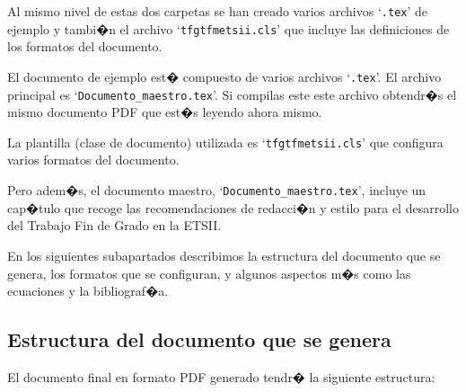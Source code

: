 Al mismo nivel de estas dos carpetas se han creado varios archivos `\texttt{.tex}' de ejemplo y tambi�n el archivo `\texttt{tfgtfmetsii.cls}' que incluye las definiciones de los formatos del documento.

El documento de ejemplo est� compuesto de varios archivos `\texttt{.tex}'. El archivo principal es 
`\verb'Documento_maestro.tex''. Si compilas este este archivo obtendr�s el mismo documento PDF que est�s leyendo ahora mismo.

La plantilla (clase de documento) utilizada es `\texttt{tfgtfmetsii.cls}' que configura varios formatos del documento.

Pero adem�s, el documento maestro, `\verb'Documento_maestro.tex'', incluye un cap�tulo que recoge las recomendaciones de redacci�n y estilo para el desarrollo del Trabajo Fin de Grado en la ETSII.


En los siguientes subapartados describimos la estructura del documento que se genera, los formatos que se configuran, y algunos aspectos m�s como las ecuaciones y la bibliograf�a.

\subsection{Estructura del documento que se genera}
\label{sec:manual:estructuraDocumentoMaestro}

El documento final en formato PDF generado tendr� la siguiente estructura:

